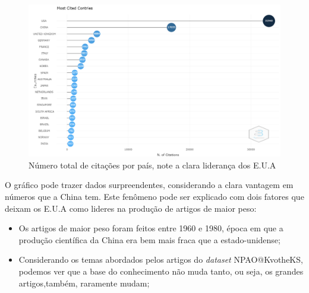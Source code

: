     \begin{figure}[H]
        \centering
        \includegraphics[width=1\textwidth]{experiments/KvotheKS/PesqBibliogr/AlgoritmosSimulacaoOptica-Dinamica/WoS-20220202/Bibliometric/Authors/Most_cited_countries.png}
        \caption{Número total de citações por país, note a clara liderança dos E.U.A}
        \label{fig:KvotheKS:Most_cited_countries}
    \end{figure}
    
    O gráfico pode trazer dados surpreendentes, considerando a clara vantagem em números que a China tem. Este fenômeno pode ser explicado com dois fatores que deixam os E.U.A como lideres na produção de artigos de maior peso:
    
    \begin{itemize}
        \item Os artigos de maior peso foram feitos entre 1960 e 1980, época em que a produção científica da China era bem mais fraca que a estado-unidense;
        \item Considerando os temas abordados pelos artigos do \emph{dataset} NPAO@KvotheKS, podemos ver que a base do conhecimento não muda tanto, ou seja, os grandes artigos,também, raramente mudam;
    \end{itemize}